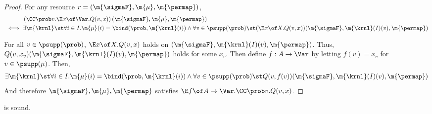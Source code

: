 \documentclass[acmsmall,nonacm,screen,appendix]{acmart}
\begin{document}
\begin{proof}
  For any resource $r = (\m{\sigmaF}, \m{\mu}, \m{\permap})$,
  \begin{align*}
    &
    \left(\CC\prob v. \E x \of \Var. Q(v, x) \right) (\m{\sigmaF}, \m{\mu}, \m{\permap}) \\
    {}\iff {} &
    \exists \m{\krnl} \st
             \forall i \in I.
             \m{\mu}(i) = \bind(\prob, \m{\krnl}(i))
    {}\land{}
    \forall v\in  \psupp(\prob) \st
     (\E x \of X. Q(v, x))(\m{\sigmaF}, \m{\krnl}(I)(v), \m{\permap})
  \end{align*}

   For all $v\in \psupp(\prob)$,
   $\E x \of X. Q(v, x)$ holds on $(\m{\sigmaF}, \m{\krnl}(I)(v), \m{\permap})$.
   Thus,
   $Q(v, x_v)(\m{\sigmaF}, \m{\krnl}(I)(v), \m{\permap})$
   holds for some $x_v$.
   Then define $f: A \to \Var$ by letting $f(v) = x_v$ for $v \in \psupp(\mu)$.
   Then,
   \begin{align*}
   \exists \m{\krnl} \st
             \forall i \in I.
             \m{\mu}(i) = \bind(\prob, \m{\krnl}(i))
               {}\land{}
              \forall v\in  \psupp(\prob) \st
      Q(v, f(v))(\m{\sigmaF}, \m{\krnl}(I)(v), \m{\permap})
  \end{align*}
  And therefore $\m{\sigmaF}, \m{\mu}, \m{\permap}$
  satisfies ${\E f \of A \to \Var. \CC\prob v. Q(v, x)}$.
\end{proof} \begin{lemma}
\label{proof:c-transf}
   is sound.
\end{lemma}
\end{document}
